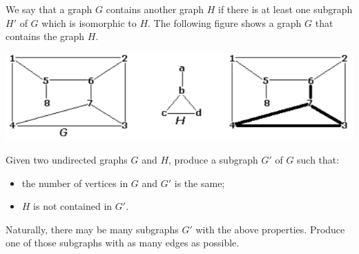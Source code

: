 We say that a graph $G$ contains another graph $H$ if there is at least one subgraph $H'$ of $G$ which is isomorphic to $H$. The following figure shows a graph $G$ that contains the graph $H$. 

\begin{center}
\includegraphics[scale=0.7]{pic3.png}
\end{center}

Given two undirected graphs $G$ and $H$, produce a subgraph $G'$ of $G$ such that:

\begin{itemize}
\item the number of vertices in $G$ and $G'$ is the same;
\item $H$ is not contained in $G'$.
\end{itemize}

Naturally, there may be many subgraphs $G'$ with the above properties. Produce one of those subgraphs with as many edges as possible. 
